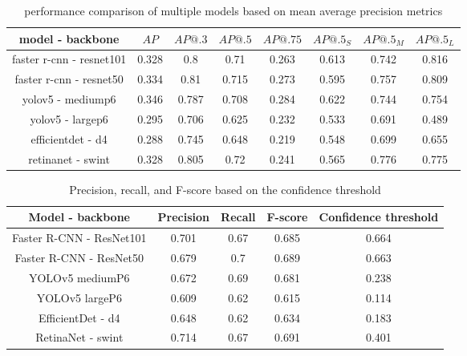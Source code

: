 \begin{table}
    \begin{tabular}{c||c|c|c|c|c|c|c}
        model - backbone         & $AP$  & $AP@.3$ & $AP@.5$ & $AP@.75$ & $AP@.5_S$ & $AP@.5_M$ & $AP@.5_L$ \\ \hline \hline
        faster r-cnn - resnet101 & 0.328 & 0.8     & 0.71    & 0.263    & 0.613     & 0.742     & 0.816     \\ \hline
        faster r-cnn - resnet50  & 0.334 & 0.81    & 0.715   & 0.273    & 0.595     & 0.757     & 0.809     \\ \hline
        yolov5 - mediump6        & 0.346 & 0.787   & 0.708   & 0.284    & 0.622     & 0.744     & 0.754     \\ \hline
        yolov5 - largep6         & 0.295 & 0.706   & 0.625   & 0.232    & 0.533     & 0.691     & 0.489     \\ \hline
        efficientdet - d4        & 0.288 & 0.745   & 0.648   & 0.219    & 0.548     & 0.699     & 0.655     \\ \hline
        retinanet - swint        & 0.328 & 0.805   & 0.72    & 0.241    & 0.565     & 0.776     & 0.775     \\
    \end{tabular}
    \caption{performance comparison of multiple models based on mean average precision metrics}
    \label{tab:model_comparison4k}
\end{table}

\begin{table}
    \begin{tabular}{c||c|c|c|c}
        Model - backbone         & Precision & Recall & F-score & Confidence threshold \\ \hline \hline
        Faster R-CNN - ResNet101 & 0.701     & 0.67   & 0.685   & 0.664                \\ \hline
        Faster R-CNN - ResNet50  & 0.679     & 0.7    & 0.689   & 0.663                \\ \hline
        YOLOv5 mediumP6          & 0.672     & 0.69   & 0.681   & 0.238                \\ \hline
        YOLOv5 largeP6           & 0.609     & 0.62   & 0.615   & 0.114                \\ \hline
        EfficientDet - d4        & 0.648     & 0.62   & 0.634   & 0.183                \\ \hline
        RetinaNet - swint        & 0.714     & 0.67   & 0.691   & 0.401                \\ \hline
    \end{tabular}
    \caption{Precision, recall, and F-score based on the confidence threshold}
    \label{tab:model_prf4k}
\end{table}